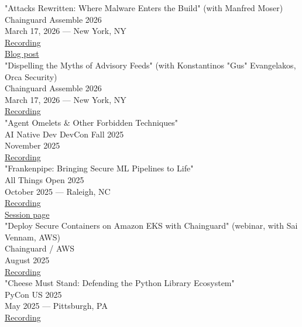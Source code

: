 \documentclass[11pt]{article}
\begin{document}
"Attacks Rewritten: Where Malware Enters the Build" (with Manfred Moser)\\[0pt]
Chainguard Assemble 2026\\[0pt]
March 17, 2026 — New York, NY\\[0pt]
\href{https://www.youtube.com/watch?v=hgZQvy9dUOU}{Recording}\\[0pt]
\href{https://www.chainguard.dev/unchained/attacks-rewritten-where-malware-enters-the-build}{Blog post}\\[0pt]

"Dispelling the Myths of Advisory Feeds" (with Konstantinos "Gus" Evangelakos, Orca Security)\\[0pt]
Chainguard Assemble 2026\\[0pt]
March 17, 2026 — New York, NY\\[0pt]
\href{https://www.youtube.com/watch?v=DYyEXLwKT2U}{Recording}\\[0pt]

"Agent Omelets \& Other Forbidden Techniques"\\[0pt]
AI Native Dev DevCon Fall 2025\\[0pt]
November 2025\\[0pt]
\href{https://www.youtube.com/watch?v=MBbN4-UxKp4}{Recording}\\[0pt]

"Frankenpipe: Bringing Secure ML Pipelines to Life"\\[0pt]
All Things Open 2025\\[0pt]
October 2025 — Raleigh, NC\\[0pt]
\href{https://www.youtube.com/watch?v=jefbTBfl9Ps}{Recording}\\[0pt]
\href{https://2025.allthingsopen.org/sessions/frankenpipe-bringing-secure-ml-pipelines-to-life}{Session page}\\[0pt]

"Deploy Secure Containers on Amazon EKS with Chainguard" (webinar, with Sai Vennam, AWS)\\[0pt]
Chainguard / AWS\\[0pt]
August 2025\\[0pt]
\href{https://www.youtube.com/watch?v=BknFieQXSqA}{Recording}\\[0pt]

"Cheese Must Stand: Defending the Python Library Ecosystem"\\[0pt]
PyCon US 2025\\[0pt]
May 2025 — Pittsburgh, PA\\[0pt]
\href{https://www.youtube.com/watch?v=5cdC5pVkCvU}{Recording}\\[0pt]
\end{document}
